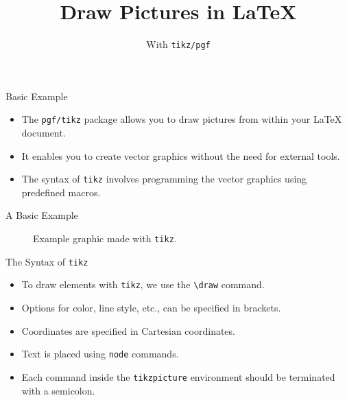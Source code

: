 \documentclass{beamer}
\title{Draw Pictures in \LaTeX}
\subtitle{With \texttt{tikz/pgf}}
\begin{document}
\begin{frame}
  \titlepage
\end{frame}

\begin{frame}{Basic Example}
  \begin{itemize}
    \item The \texttt{pgf/tikz} package allows you to draw pictures from within your \LaTeX{} document.
    \item It enables you to create vector graphics without the need for external tools.
    \item The syntax of \texttt{tikz} involves programming the vector graphics using predefined macros.
  \end{itemize}
\end{frame}

\begin{frame}{A Basic Example}
  \begin{figure}[h!]
    \centering
    \caption{Example graphic made with \texttt{tikz}.}
  \end{figure}
\end{frame}

\begin{frame}{The Syntax of \texttt{tikz}}
  \begin{itemize}
    \item To draw elements with \texttt{tikz}, we use the \texttt{\textbackslash draw} command.
    \item Options for color, line style, etc., can be specified in brackets.
    \item Coordinates are specified in Cartesian coordinates.
    \item Text is placed using \texttt{node} commands.
    \item Each command inside the \texttt{tikzpicture} environment should be terminated with a semicolon.
  \end{itemize}
\end{frame}
\end{document}
